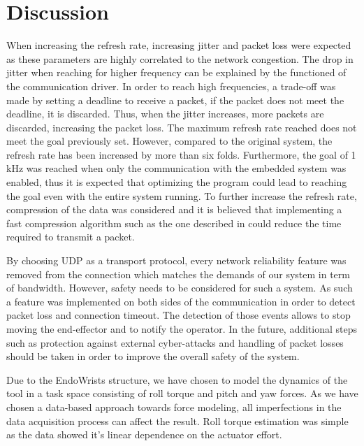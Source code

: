 \section{Discussion}

When increasing the refresh rate, increasing jitter and packet loss were expected as these parameters are highly correlated to the network congestion\cite{cisco_jitter}. The drop in jitter when reaching for higher frequency can be explained by the functioned of the communication driver. In order to reach high frequencies, a trade-off was made by setting a deadline to receive a packet, if the packet does not meet the deadline, it is discarded. Thus, when the jitter increases, more packets are discarded, increasing the packet loss.
The maximum refresh rate reached does not meet the goal previously set. However, compared to the original system, the refresh rate has been increased by more than six folds. Furthermore, the goal of 1 kHz was reached when only the communication with the embedded system was enabled, thus it is expected that optimizing the program could lead to reaching the goal even with the entire system running.
To further increase the refresh rate, compression of the data was considered and it is believed that implementing a fast compression algorithm such as the one described in \cite{fast_ZIV} could reduce the time required to transmit a packet.

{\color{purple}By choosing UDP as a transport protocol, every network reliability feature was removed from the connection which matches the demands of our system in term of bandwidth. 
However, safety needs to be considered for such a system. 
As such a feature was implemented on both sides of the communication in order to detect packet loss and connection timeout. 
The detection of those events allows to stop moving the end-effector and to notify the operator. 
In the future, additional steps such as protection against external cyber-attacks and handling of packet losses should be taken in order to improve the overall safety of the system.
}

Due to the EndoWrists structure, we have chosen to model the dynamics of the tool in a task space consisting of roll torque and pitch and yaw forces.
As we have chosen a data-based approach towards force modeling, all imperfections in the data acquisition process can affect the result.
Roll torque estimation was simple as the data showed it's linear dependence on the actuator effort.

